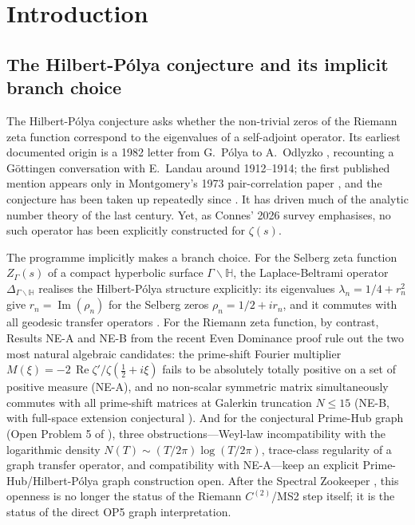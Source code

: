 \documentclass[11pt]{article}
\theoremstyle{definition}
\theoremstyle{remark}
\renewcommand{\Re}{\operatorname{Re}}
\newcommand{\halfline}{\tfrac{1}{2}}
\newcommand{\zer}[1]{\zeta'/\zeta(#1)}
\begin{document}
\section{Introduction}
\label{sec:intro}

\subsection{The Hilbert-P\'olya conjecture and its implicit branch
choice}
\label{sec:hp-implicit-branch}

The Hilbert-P\'olya conjecture asks whether the non-trivial zeros of
the Riemann zeta function correspond to the eigenvalues of a
self-adjoint operator. Its earliest documented origin is a 1982 letter
from G.~P\'olya to A.~Odlyzko \cite{Polya1982letter}, recounting a
Göttingen conversation with E.~Landau around 1912--1914; the first
published mention appears only in Montgomery's 1973 pair-correlation
paper \cite{Montgomery1973}, and the conjecture has been taken up
repeatedly since \cite{Berry1985, BerryKeating1999, Connes1999}. It
has driven much of the analytic number theory of the last century.
Yet, as Connes' 2026 survey \cite{Connes2026} emphasises, no such
operator has been explicitly constructed for $\zeta(s)$.

The programme implicitly makes a branch choice. For the Selberg zeta
function $Z_\Gamma(s)$ of a compact hyperbolic surface
$\Gamma\backslash\mathbb{H}$, the Laplace-Beltrami operator
$\Delta_{\Gamma\backslash\mathbb{H}}$ realises the Hilbert-P\'olya
structure explicitly: its eigenvalues $\lambda_n = 1/4 + r_n^2$ give
$r_n = \operatorname{Im}(\rho_n)$ for the Selberg zeros $\rho_n =
1/2 + ir_n$, and it commutes with all geodesic transfer operators
\cite{Selberg1956}. For the Riemann zeta function, by contrast,
Results NE-A and NE-B from the recent Even Dominance proof
\cite{Geiger2026RHII} rule out the two most natural algebraic
candidates: the prime-shift Fourier multiplier
$M(\xi) = -2\,\Re\zer{\halfline + i\xi}$ fails to be absolutely
totally positive on a set of positive measure (NE-A), and no
non-scalar symmetric matrix simultaneously commutes with all
prime-shift matrices at Galerkin truncation $N\leq 15$ (NE-B, with
full-space extension conjectural \cite{Geiger2026RHII}). And for the
conjectural Prime-Hub graph (Open Problem 5 of
\cite{Geiger2026RHIII}), three obstructions---Weyl-law incompatibility
with the logarithmic density $N(T)\sim (T/2\pi)\log(T/2\pi)$, trace-class
regularity of a graph transfer operator, and compatibility with
NE-A---keep an explicit Prime-Hub/Hilbert-P\'olya graph construction
open.  After the Spectral Zookeeper \cite{Zookeeper2026}, this
openness is no longer the status of the Riemann $C^{(2)}$/MS2 step
itself; it is the status of the direct OP5 graph interpretation.
\end{document}
